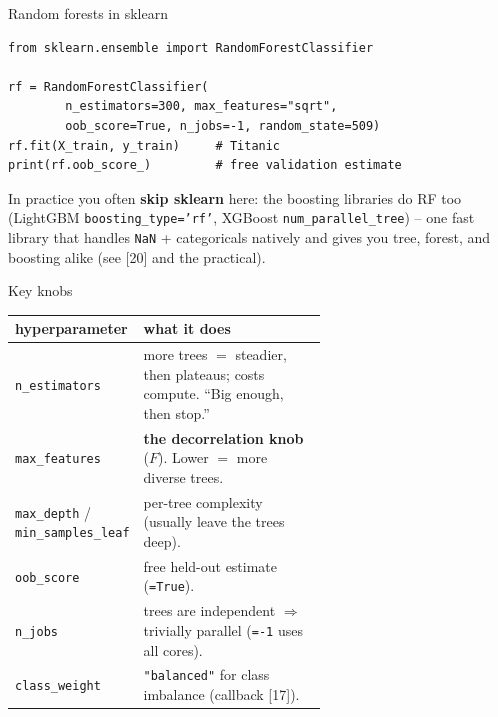 \documentclass[aspectratio=169]{beamer}
\begin{document}
\begin{frame}[fragile]{Random forests in sklearn}
\begin{lstlisting}
from sklearn.ensemble import RandomForestClassifier

rf = RandomForestClassifier(
        n_estimators=300, max_features="sqrt",
        oob_score=True, n_jobs=-1, random_state=509)
rf.fit(X_train, y_train)     # Titanic
print(rf.oob_score_)         # free validation estimate
\end{lstlisting}
  \vfill
  \vskip 3pt
  {\footnotesize In practice you often \textbf{skip sklearn} here: the boosting libraries do RF
  too (LightGBM \texttt{boosting\_type='rf'}, XGBoost \texttt{num\_parallel\_tree}) -- one fast
  library that handles \texttt{NaN} + categoricals natively and gives you tree, forest, and
  boosting alike (see [20] and the practical).}
\end{frame}

\begin{frame}{Key knobs}
  \begin{center}\footnotesize
    \renewcommand{\arraystretch}{1.2}
    \begin{tabular}{l p{0.62\linewidth}}
      hyperparameter & what it does \\
      \hline
      \texttt{n\_estimators} & more trees $=$ steadier, then plateaus; costs compute. ``Big enough, then stop.'' \\
      \texttt{max\_features} & \textbf{the decorrelation knob} ($F$). Lower $=$ more diverse trees. \\
      \texttt{max\_depth} / \texttt{min\_samples\_leaf} & per-tree complexity (usually leave the trees deep). \\
      \texttt{oob\_score} & free held-out estimate (\texttt{=True}). \\
      \texttt{n\_jobs} & trees are independent $\Rightarrow$ trivially parallel (\texttt{=-1} uses all cores). \\
      \texttt{class\_weight} & \texttt{"balanced"} for class imbalance (callback [17]). \\
      \hline
    \end{tabular}
  \end{center}
  \vfill
\end{frame}
\end{document}
